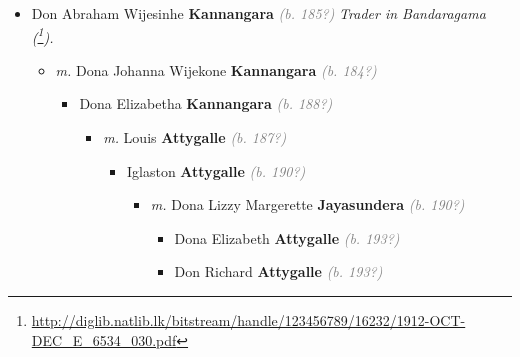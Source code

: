 \documentclass[10pt, openany]{book}
\begin{document}
\begin{itemize}
{\begin{itemize}
{\begin{itemize}
{\begin{itemize}
{\begin{itemize}
{\begin{itemize}
{\begin{itemize}
{\begin{itemize}
\item{INS \textbf{Senaratne} \textcolor{gray}{\textit{(b. 195?)}}
 }
\item{JGS \textbf{Senaratne} \textcolor{gray}{\textit{(b. 196?)}}
 }
\item{RS \textbf{Senaratne} \textcolor{gray}{\textit{(b. 196?)}}
 }
\end{itemize}}
\end{itemize}
  }
\end{itemize}}
\end{itemize}
   }
\item{Ebert \textbf{Welikala} \textcolor{gray}{\textit{(b. 189?)}}
 }
\end{itemize}}
\end{itemize}
   }
\item{Don Abraham Wijesinhe \textbf{Kannangara} \textcolor{gray}{\textit{(b. 185?)}} \textcolor{slmaroon}{\textit{Trader in Bandaragama (\footnote{\url{http://diglib.natlib.lk/bitstream/handle/123456789/16232/1912-OCT-DEC_E_6534_030.pdf}}).}}
\begin{itemize}
\item{\textit{m.} Dona Johanna Wijekone \textbf{Kannangara} \textcolor{gray}{\textit{(b. 184?)}}   \label{couple:00000394:00000420} \begin{itemize}
\item{Dona Elizabetha \textbf{Kannangara} \textcolor{gray}{\textit{(b. 188?)}}
\begin{itemize}
\item{\textit{m.} Louis \textbf{Attygalle} \textcolor{gray}{\textit{(b. 187?)}}   \label{couple:00000113:00000416} \begin{itemize}
\item{Iglaston \textbf{Attygalle} \textcolor{gray}{\textit{(b. 190?)}}
\begin{itemize}
\item{\textit{m.} Dona Lizzy Margerette \textbf{Jayasundera} \textcolor{gray}{\textit{(b. 190?)}}   \label{couple:00000108:00000348} \begin{itemize}
\item{Dona Elizabeth \textbf{Attygalle} \textcolor{gray}{\textit{(b. 193?)}}
  }
\item{Don Richard \textbf{Attygalle} \textcolor{gray}{\textit{(b. 193?)}}
}
\end{itemize}}
\end{itemize}}
\end{itemize}}
\end{itemize}}
\end{itemize}}
\end{itemize}}
\end{itemize}}
\end{itemize}
\end{document}
